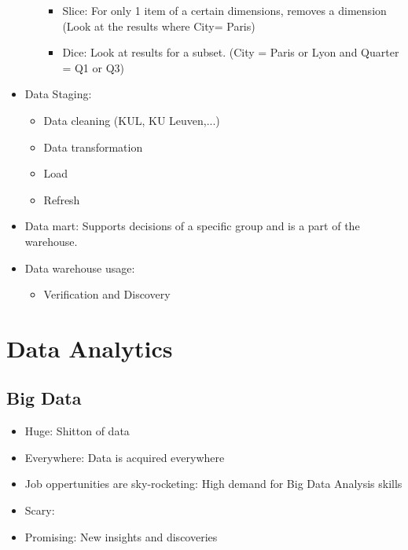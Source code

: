 \documentclass[]{report}
\begin{document}
\begin{itemize}
\begin{itemize}
\begin{itemize}
          \item Slice: For only 1 item of a certain dimensions, removes a dimension (Look at the results where City= Paris)
          \item Dice: Look at results for a subset. (City = Paris or Lyon and Quarter = Q1 or Q3)
        \end{itemize}
      \end{itemize}
      \item Data Staging:
      \begin{itemize}
        \item Data cleaning (KUL, KU Leuven,...)
        \item Data transformation
        \item Load
        \item Refresh
      \end{itemize}
      \item Data mart: Supports decisions of a specific group and is a part of the warehouse.
      \item Data warehouse usage:
      \begin{itemize}
        \item Verification and Discovery
      \end{itemize}

    \end{itemize}


  \section{Data Analytics}
    \subsection{Big Data}
      \begin{itemize}
        \item Huge: Shitton of data
        \item Everywhere: Data is acquired everywhere
        \item Job oppertunities are sky-rocketing: High demand for Big Data Analysis skills
        \item Scary:
        \item Promising: New insights and discoveries
      \end{itemize}
\end{document}
